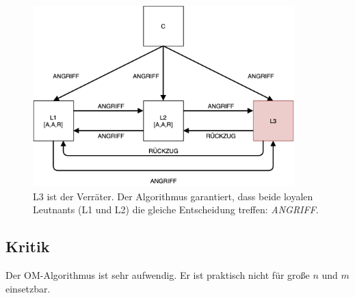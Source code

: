 \documentclass{article}
\begin{document}
\begin{figure}[H]
    \centering
    \includegraphics[width=0.9\textwidth]{omalgo.png}
    \caption{L3 ist der Verräter. Der Algorithmus garantiert, dass beide loyalen Leutnants (L1 und L2) die gleiche Entscheidung treffen: \textit{ANGRIFF}. }
    \label{fig:OMAlgorithm}
\end{figure}

\subsection{Kritik}

Der OM-Algorithmus ist sehr aufwendig. Er ist praktisch nicht für große $n$ und $m$ einsetzbar.  
\fi
\end{document}
